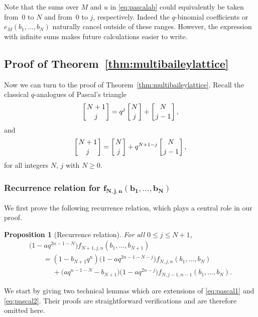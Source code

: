 \documentclass[11pt]{article}
\numberwithin{equation}{section}
\newtheorem{Proposition}[Theorem]{Proposition}
 { \theoremstyle{definition}
\newtheorem{Definition}[Theorem]{Definition}
\newtheorem{Note}[Theorem]{Note}
\newtheorem{Example}[Theorem]{Example}
\newtheorem{Remark}[Theorem]{Remark} }
\begin{document}
\begin{Remark}
Note that the sums over $M$ and $u$ in \eqref{eq:pascalab} could equivalently be taken from~$0$ to $N$ and from~$0$ to $j$, respectively. Indeed the $q$-binomial coefficients or $e_M(b_1,\dots ,b_N)$ naturally cancel outside of these ranges. However, the expression with infinite sums makes future calculations easier to write.
\end{Remark}


\setcounter{section}{3}\setcounter{subsection}{1}\setcounter{Theorem}{6}\setcounter{equation}{0}
\subsection[Proof of Theorem~\ref{thm:multibaileylattice}]{Proof of Theorem~\ref{thm:multibaileylattice}}

Now we can turn to the proof of Theorem~\ref{thm:multibaileylattice}.
Recall the classical $q$-analogues of Pascal's triangle
\begin{equation}\label{eq:pascal1}
\left[{N+1\atop j}\right] = q^j\left[{N\atop j}\right]+\left[{N\atop j-1}\right],
\end{equation}
and
\begin{equation} \label{eq:pascal2}
\left[{N+1\atop j}\right]=\left[{N\atop j}\right]+ q^{N+1-j}\left[{N\atop j-1}\right],
\end{equation}
for all integers $N$, $j$ with $N\geq 0$.

\subsubsection[Recurrence relation for f\_\{N,j,n\}(b\_1,...,b\_N)]{Recurrence relation for $\boldsymbol{f_{N,j,n}(b_1,\ldots,b_N)}$}
We first prove the following recurrence relation, which plays a central role in our proof.
\begin{Proposition}[Recurrence relation]\label{prop:rec} For all $0\leq j\leq N+1$,
\begin{gather*}
\bigl(1-aq^{2n-1-N}\bigr)f_{N+1,j,n}(b_1,\ldots,b_{N+1})\\
\qquad =(1-b_{N+1}q^n)\bigl(1-aq^{2n-1-N-j}\bigr)f_{N,j,n}(b_1,\ldots,b_N)\\
\phantom{\qquad =}{}+\bigl(aq^{n-1-N}-b_{N+1}\bigr)\bigl(1-aq^{2n-j}\bigr)f_{N,j-1,n-1}(b_1,\ldots,b_N).
\end{gather*}
\end{Proposition}

We start by giving two technical lemmas which are extensions of \eqref{eq:pascal1} and \eqref{eq:pascal2}. Their proofs are straightforward verifications and are therefore omitted here.
\end{document}
